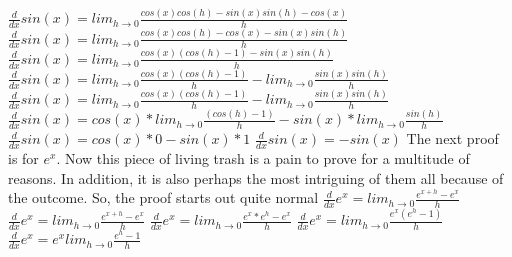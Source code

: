 \documentclass{article}
\begin{document}
\newline
\newline
$\frac{d}{dx} sin(x) =  lim_{h\to 0}\frac{cos(x)cos(h)- sin(x)sin(h) - cos(x)}{h}$
\newline
\newline
$\frac{d}{dx} sin(x) =  lim_{h\to 0}\frac{cos(x)cos(h) - cos(x) - sin(x)sin(h)}{h}$
\newline
\newline
$\frac{d}{dx} sin(x) =  lim_{h\to 0}\frac{cos(x)(cos(h) - 1) - sin(x)sin(h)}{h}$
\newline
\newline
$\frac{d}{dx} sin(x) = lim_{h\to 0} \frac{cos(x)(cos(h) - 1)}{h} - lim_{h\to 0}\frac{ sin(x)sin(h)}{h}$
\newline
\newline
$\frac{d}{dx} sin(x) =  lim_{h\to 0}\frac{cos(x)(cos(h) - 1)}{h} - lim_{h\to 0}\frac{ sin(x)sin(h)}{h}$
\newline
\newline
$\frac{d}{dx} sin(x) =  cos(x)*lim_{h\to 0}\frac{(cos(h) - 1)}{h} - sin(x)*lim_{h\to 0}\frac{sin(h)}{h}$
\newline
\newline
$\frac{d}{dx} sin(x) =  cos(x)*0- sin(x)*1$
\newline
\newline
$\frac{d}{dx} sin(x) =  - sin(x)$
\newline
\newline
The next proof is for $e^x$. Now this piece of living trash is a pain to prove for a multitude of reasons. In addition, it is also perhaps the most intriguing of them all because of the outcome.
\newline
\newline
So, the proof starts out quite normal
\newline
\newline
$\frac{d}{dx}e^x = lim_{h\to 0}\frac{e^{x+h} - e^x}{h}$
\newline
\newline
$\frac{d}{dx}e^x = lim_{h\to 0}\frac{e^{x+h} - e^x}{h}$
\newline
\newline
$\frac{d}{dx}e^x = lim_{h\to 0}\frac{e^x * e^h - e^x}{h}$
\newline
\newline
$\frac{d}{dx}e^x = lim_{h\to 0}\frac{e^x(e^h - 1)}{h}$
\newline
\newline
$\frac{d}{dx}e^x = e^xlim_{h\to 0}\frac{e^h - 1}{h}$
\end{document}
